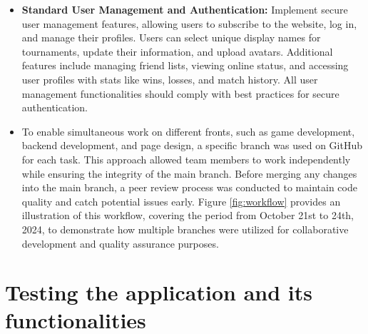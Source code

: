 \begin{itemize}
    \item \textbf{Standard User Management and Authentication:} Implement secure user management features, allowing users to subscribe to the website, log in, and manage their profiles. Users can select unique display names for tournaments, update their information, and upload avatars. Additional features include managing friend lists, viewing online status, and accessing user profiles with stats like wins, losses, and match history. All user management functionalities should comply with best practices for secure authentication.
    \item To enable simultaneous work on different fronts, such as game development, backend development, and page design, a specific branch was used on GitHub for each task. This approach allowed team members to work independently while ensuring the integrity of the main branch. Before merging any changes into the main branch, a peer review process was conducted to maintain code quality and catch potential issues early. Figure \ref{fig:workflow} provides an illustration of this workflow, covering the period from October 21st to 24th, 2024, to demonstrate how multiple branches were utilized for collaborative development and quality assurance purposes.
\end{itemize}

\section{Testing the application and its functionalities}


